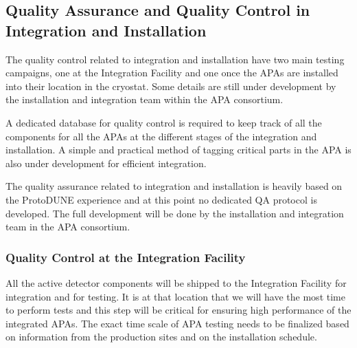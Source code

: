 

\subsection{Quality Assurance and Quality Control in Integration and Installation}
\label{sec:fdsp-apa-install-calib}

The quality control related to integration and installation have two main testing campaigns, one at the Integration Facility and one once the APAs are installed into their location in the cryostat. Some details are still under development by the installation and integration team within the APA consortium. 

A dedicated database for quality control is required to keep track of all the components for all the APAs at the different stages of the integration and installation. A simple and practical method of tagging critical parts in the APA is also under development for efficient integration.

The quality assurance related to integration and installation is heavily based on the ProtoDUNE experience and at this point no dedicated QA protocol is developed. The full development will be done by the installation and integration team in the APA consortium. 

\subsubsection{Quality Control at the Integration Facility}
\label{sec:fdsp-apa-install-qc_if}

All the active detector components will be shipped to the Integration Facility for integration and for testing. It is at that location that we will have the most time to perform tests and this step will be critical for ensuring high performance of the integrated APAs. The exact time scale of APA testing needs to be finalized based on information from the production sites and on the installation schedule. 



